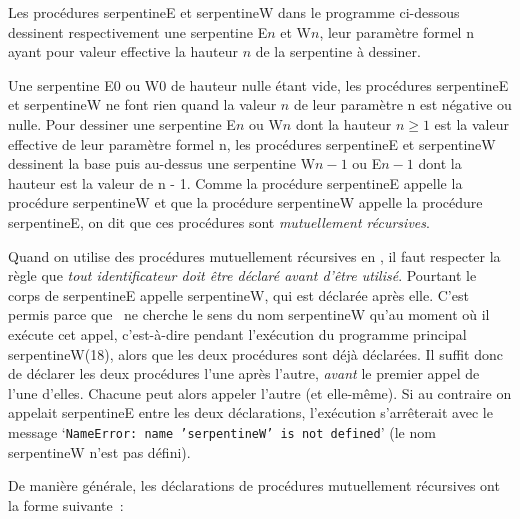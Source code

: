 \noindent Les procédures {\idt serpentineE} et {\idt serpentineW} dans le programme ci-dessous
dessinent respectivement une serpentine {\idt E$\scriptscriptstyle n$} et 
{\idt W$\scriptscriptstyle n$}, leur paramètre formel {\idt n} ayant pour valeur effective
la hauteur $n$ de la serpentine à dessiner. 

\noindent Une serpentine
{\idt E$\scriptscriptstyle 0$} ou {\idt W$\scriptscriptstyle 0$} de hauteur nulle étant vide, 
les procédures {\idt serpentineE} et {\idt serpentineW} ne font rien quand la valeur $n$ de leur 
paramètre {\idt n} est négative ou nulle. 
Pour dessiner une serpentine {\idt E$\scriptscriptstyle n$} ou {\idt W$\scriptscriptstyle n$} dont la 
hauteur $n \geq 1$ est la valeur effective de leur paramètre formel {\idt n}, les procédures 
{\idt serpentineE} et {\idt serpentineW} dessinent la 
base puis au-dessus une serpentine {\idt W$\scriptscriptstyle n-1$} 
ou {\idt E$\scriptscriptstyle n-1$} dont  la hauteur est la valeur de {\idt n - 1}. Comme
la procédure {\idt serpentineE} appelle la procédure {\idt serpentineW} et que la procédure
{\idt serpentineW} appelle la procédure {\idt serpentineE}, on dit que ces procédures sont
{\em mutuellement récursives\/}.

Quand on utilise des procédures mutuellement récursives en \python, il faut
respecter la règle que {\em tout identificateur doit être déclaré avant d'être
utilisé}. Pourtant le corps de {\idt serpentineE} appelle {\idt serpentineW}, qui est déclarée
après elle. C'est permis parce que \python\ ne cherche le sens du nom {\idt serpentineW} qu'au
moment où il exécute cet appel, c'est-à-dire pendant l'exécution du programme principal
{\idt serpentineW(18)}, alors que les deux procédures sont déjà déclarées. Il suffit donc de
déclarer les deux procédures l'une après l'autre, {\em avant} le premier appel de l'une d'elles.
Chacune peut alors appeler l'autre (et elle-même). Si au contraire on appelait {\idt serpentineE}
entre les deux déclarations, l'exécution s'arrêterait avec le message
`{\tt NameError:\ name 'serpentineW' is not defined}' (le nom {\idt serpentineW} n'est pas défini).

De manière générale, les déclarations de procédures mutuellement
ré\-cur\-si\-ves ont  la forme suivante~:

\vfill

